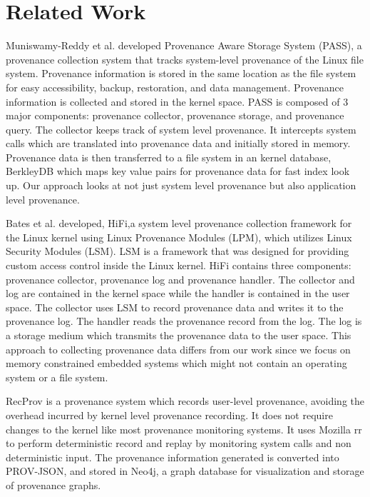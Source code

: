 \documentclass[conference]{IEEEtran}
\begin{document}
\section{Related Work}

Muniswamy-Reddy
et al. \cite{muniswamy_reddy} developed Provenance Aware Storage System (PASS), a provenance collection system that tracks  system-level provenance of the Linux file system. Provenance information
is stored in the same location as the file system for easy accessibility, backup,
restoration, and data management. Provenance information is collected and stored in
the kernel space. PASS is composed of 3 major components: provenance collector, provenance storage, and provenance query. The collector keeps track of system level provenance. It intercepts system calls which are translated into provenance data and initially stored in memory. Provenance data is then transferred to a file system in an kernel database, BerkleyDB which maps key value pairs for provenance data for fast index look up. Our approach looks at not just system level provenance but also application level provenance. 

\par Bates et al. \cite{hi_fi}  developed, HiFi,a system level provenance collection framework for the Linux kernel using Linux Provenance Modules (LPM), which utilizes Linux Security Modules (LSM). LSM is a framework that was designed for providing custom access control inside the Linux kernel. HiFi contains three components: provenance collector, provenance log and provenance handler. The collector and log are contained in the kernel space while the handler is contained in the user space. The collector uses LSM to record provenance data and writes it to the provenance log. The handler reads the provenance record from the log. The log is a storage medium which transmits the provenance data to the user space. This approach to collecting provenance data differs from our work since we focus on memory constrained embedded systems which might not contain an operating system or a file system.


\par RecProv \cite{rec_prov} is a provenance system which records user-level provenance, avoiding the overhead incurred by kernel level provenance recording. It does not require changes to the kernel like most provenance monitoring systems. It uses Mozilla rr to perform deterministic record and replay by monitoring system calls  and non deterministic input. The provenance information generated is converted into PROV-JSON, and stored in Neo4j, a graph database for visualization and storage of provenance graphs. 
\end{document}
